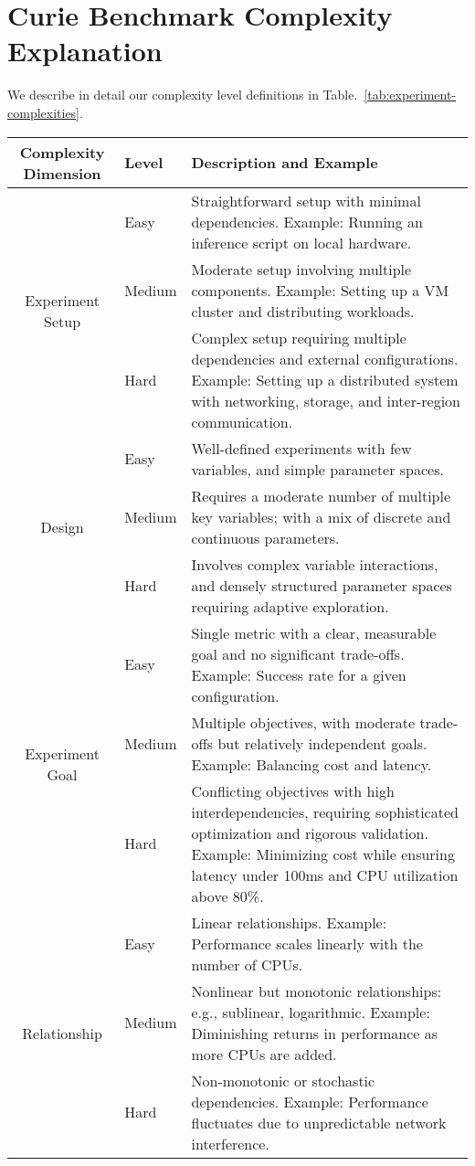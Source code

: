 \section{Curie Benchmark Complexity Explanation}
\label{app:complex}
We describe in detail our complexity level definitions in Table.~\ref{tab:experiment-complexities}. 
\begin{table*}
\caption{Descriptions of various complexity levels for experiments across multiple dimensions.}
\label{tab:experiment-complexities}
\centering
\begin{tabular}{clp{12cm}}
\hline
\textbf{Complexity Dimension} & \textbf{Level} & \textbf{Description and Example} \\
\hline
\multirow{3}{*}{Experiment Setup} & Easy & Straightforward setup with minimal dependencies. Example: Running an inference script on local hardware. \\
& Medium & Moderate setup involving multiple components. Example: Setting up a VM cluster and distributing workloads. \\
& Hard & Complex setup requiring multiple dependencies and external configurations. Example: Setting up a distributed system with networking, storage, and inter-region communication. \\
\hline
\multirow{3}{*}{Design} & Easy & Well-defined experiments with few variables, and simple parameter spaces. 
\\
& Medium & Requires a moderate number of multiple key variables; with a mix of discrete and continuous parameters.
\\
& Hard & Involves complex variable interactions, and densely structured parameter spaces requiring adaptive exploration. 
\\
\hline
\multirow{3}{*}{Experiment Goal} & Easy & Single metric with a clear, measurable goal and no significant trade-offs. 
Example: Success rate for a given configuration. 
\\
& Medium & Multiple objectives, with moderate trade-offs but relatively independent goals. 
Example: Balancing cost and latency. \\
& Hard & Conflicting objectives with high interdependencies, requiring sophisticated optimization and rigorous validation. Example: Minimizing cost while ensuring latency under 100ms and CPU utilization above 80\%. \\
\hline
\multirow{3}{*}{Relationship} & Easy & Linear relationships. Example: Performance scales linearly with the number of CPUs. \\
& Medium & Nonlinear but monotonic relationships: e.g., sublinear, logarithmic. Example: Diminishing returns in performance as more CPUs are added. \\
& Hard & Non-monotonic or stochastic dependencies. Example: Performance fluctuates due to unpredictable network interference. \\
\hline


\end{tabular}
\end{table*}
